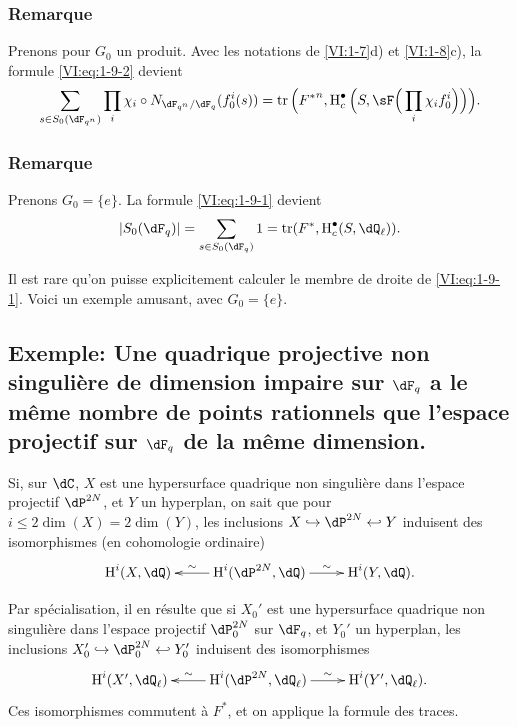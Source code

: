 \subsubsection{Remarque}\label{VI:1-9-3}

Prenons pour $G_0$ un produit. Avec les notations de \ref{VI:1-7}d) et 
\ref{VI:1-8}c), la formule \eqref{VI:eq:1-9-2} devient 
\[
  \sum_{s\in S_0(\dF_{q^n})} \prod_i \chi_i\circ N_{\dF_{q^n}/\dF_q} (f_0^i(s)) = \tr\Big({F^\ast}^n, \h_c^\bullet\Big(S,\sF\Big(\prod_i \chi_i f_0^i\Big)\Big)\Big) \text{.}
\]





\subsubsection{Remarque}\label{VI:1-9-4}

Prenons $G_0=\{e\}$. La formule \eqref{VI:eq:1-9-1} devient 
\[
  \left|S_0(\dF_q)\right| = \sum_{s\in S_0(\dF_q)} 1 = \tr(F^\ast,\h_c^\bullet(S,\dQ_\ell)) \text{.}
\]

Il est rare qu'on puisse explicitement calculer le membre de droite de 
\eqref{VI:eq:1-9-1}. Voici un exemple amusant, avec $G_0=\{e\}$. 





\subsection{Exemple: Une quadrique projective non singuli\`ere de dimension impaire sur \texorpdfstring{$\dF_q$}{Fq} a le m\^eme nombre de points rationnels que l'espace projectif sur \texorpdfstring{$\dF_q$}{Fq} de la m\^eme dimension.}

Si, sur $\dC$, $X$ est une hypersurface quadrique non singuli\`ere dans 
l'espace projectif $\dP^{2 N}$, et $Y$ un hyperplan, on sait que pour 
$i\leqslant 2\dim(X)=2\dim(Y)$, les inclusions 
$X\hookrightarrow \dP^{2 N}\hookleftarrow Y$ induisent des isomorphismes (en 
cohomologie ordinaire) 
\[\xymatrix{
  \h^i(X,\dQ) 
    & \ar[l]_-\sim \h^i(\dP^{2 N},\dQ) \ar[r]^-\sim 
    & \h^i(Y,\dQ) \text{.}
}\]

Par sp\'ecialisation, il en r\'esulte que si $X_0'$ est une hypersurface 
quadrique non singuli\`ere dans l'espace projectif $\dP_0^{2 N}$ sur $\dF_q$, 
et $Y_0'$ un hyperplan, les inclusions 
$X_0'\hookrightarrow \dP_0^{2 N}\hookleftarrow Y_0'$ induisent des 
isomorphismes 
\[\xymatrix{
  \h^i(X',\dQ_\ell) 
    & \ar[l]_-\sim \h^i(\dP^{2 N},\dQ_\ell) \ar[r]^-\sim 
    & \h^i(Y',\dQ_\ell) \text{.}
}\]
Ces isomorphismes commutent \`a $F^\ast$, et on applique la formule des traces. 





